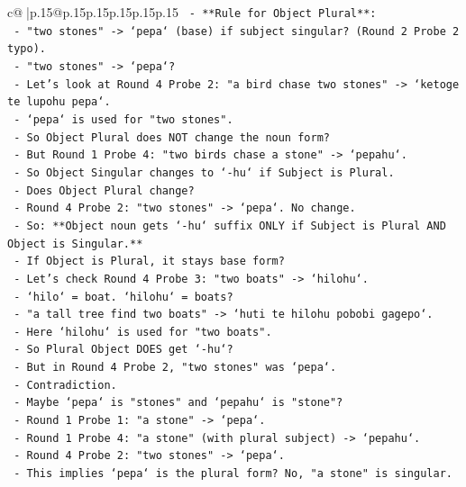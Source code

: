 \documentclass{article}
\begin{document}
{\begin{supertabular}{c@{$\;$}|p{.15\linewidth}@{}p{.15\linewidth}p{.15\linewidth}p{.15\linewidth}p{.15\linewidth}p{.15\linewidth}}
{{{\texttt{    {-} **Rule for Object Plural**:} \\
\texttt{      {-} "two stones" {-}> `pepa` (base) if subject singular? (Round 2 Probe 2 typo).} \\
\texttt{      {-} "two stones" {-}> `pepa`?} \\
\texttt{      {-} Let's look at Round 4 Probe 2: "a bird chase two stones" {-}> `ketoge te lupohu pepa`.} \\
\texttt{      {-} `pepa` is used for "two stones".} \\
\texttt{      {-} So Object Plural does NOT change the noun form?} \\
\texttt{      {-} But Round 1 Probe 4: "two birds chase a stone" {-}> `pepahu`.} \\
\texttt{      {-} So Object Singular changes to `{-}hu` if Subject is Plural.} \\
\texttt{      {-} Does Object Plural change?} \\
\texttt{      {-} Round 4 Probe 2: "two stones" {-}> `pepa`. No change.} \\
\texttt{      {-} So: **Object noun gets `{-}hu` suffix ONLY if Subject is Plural AND Object is Singular.**} \\
\texttt{      {-} If Object is Plural, it stays base form?} \\
\texttt{      {-} Let's check Round 4 Probe 3: "two boats" {-}> `hilohu`.} \\
\texttt{      {-} `hilo` = boat. `hilohu` = boats?} \\
\texttt{      {-} "a tall tree find two boats" {-}> `huti te hilohu pobobi gagepo`.} \\
\texttt{      {-} Here `hilohu` is used for "two boats".} \\
\texttt{      {-} So Plural Object DOES get `{-}hu`?} \\
\texttt{      {-} But in Round 4 Probe 2, "two stones" was `pepa`.} \\
\texttt{      {-} Contradiction.} \\
\texttt{      {-} Maybe `pepa` is "stones" and `pepahu` is "stone"?} \\
\texttt{      {-} Round 1 Probe 1: "a stone" {-}> `pepa`.} \\
\texttt{      {-} Round 1 Probe 4: "a stone" (with plural subject) {-}> `pepahu`.} \\
\texttt{      {-} Round 4 Probe 2: "two stones" {-}> `pepa`.} \\
\texttt{      {-} This implies `pepa` is the plural form? No, "a stone" is singular.} \\
}}}
\end{supertabular}}
\end{document}

